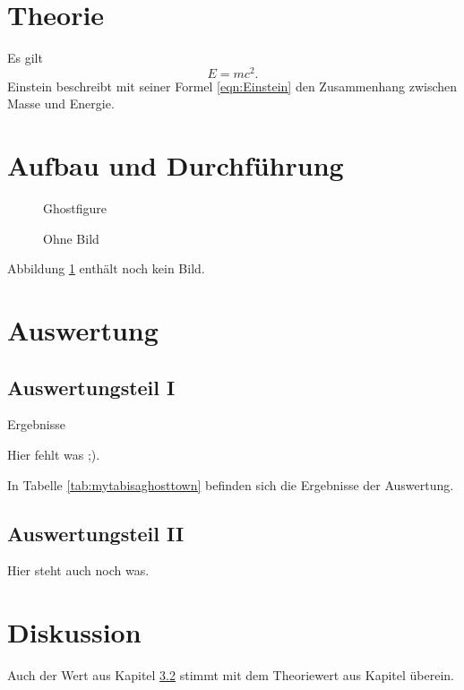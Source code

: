 \documentclass[
  captions=tableheading,
]{scrartcl}
\begin{document}
\section{Theorie}

Es gilt
\begin{equation}
  E = mc^2 .
  \label{eqn:Einstein}
\end{equation}
Einstein beschreibt mit seiner Formel \eqref{eqn:Einstein} den Zusammenhang zwischen Masse und Energie.

\section{Aufbau und Durchführung}

\begin{figure}
  \centering
  Ghostfigure
  \caption{Ohne Bild}
  \label{fig:ghost}
\end{figure}
Abbildung \ref{fig:ghost} enthält noch kein Bild.

\section{Auswertung}

\subsection{Auswertungsteil I}

\begin{table}
  \centering
  \caption{Ergebnisse}
  \label{tab:mytabisaghosttown}
  Hier fehlt was ;).
\end{table}
In Tabelle \ref{tab:mytabisaghosttown} befinden sich die Ergebnisse der Auswertung.

\subsection{Auswertungsteil II}
\label{sec:Auswertung2}

Hier steht auch noch was.

\section{Diskussion}

Auch der Wert aus Kapitel \ref{sec:Auswertung2} stimmt mit dem Theoriewert aus Kapitel überein.
\end{document}
